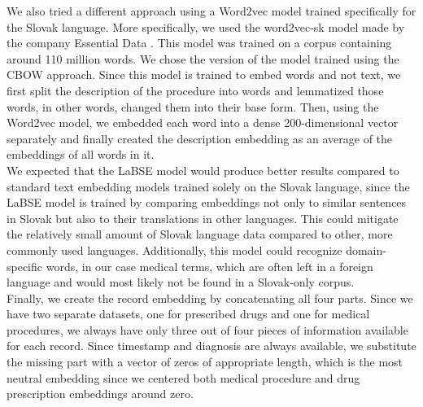 We also tried a different approach using a Word2vec model trained specifically for the Slovak language. More specifically, we used the word2vec-sk model made by the company Essential Data \cite{w2v}. This model was trained on a corpus containing around 110 million words. We chose the version of the model trained using the CBOW approach. Since this model is trained to embed words and not text, we first split the description of the procedure into words and lemmatized those words, in other words, changed them into their base form. Then, using the Word2vec model, we embedded each word into a dense 200-dimensional vector separately and finally created the description embedding as an average of the embeddings of all words in it.
\\

We expected that the LaBSE model would produce better results compared to standard text embedding models trained solely on the Slovak language, since the LaBSE model is trained by comparing embeddings not only to similar sentences in Slovak but also to their translations in other languages. This could mitigate the relatively small amount of Slovak language data compared to other, more commonly used languages. Additionally, this model could recognize domain-specific words, in our case medical terms, which are often left in a foreign language and would most likely not be found in a Slovak-only corpus.
\\

Finally, we create the record embedding by concatenating all four parts. Since we have two separate datasets, one for prescribed drugs and one for medical procedures, we always have only three out of four pieces of information available for each record. Since timestamp and diagnosis are always available, we substitute the missing part with a vector of zeros of appropriate length, which is the most neutral embedding since we centered both medical procedure and drug prescription embeddings around zero.
